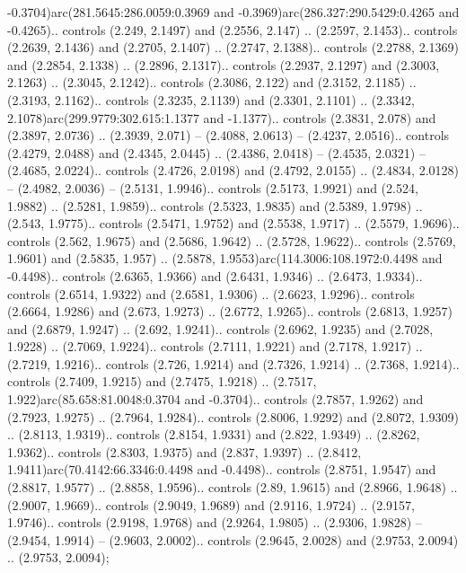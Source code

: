 -0.3704)arc(281.5645:286.0059:0.3969 and -0.3969)arc(286.327:290.5429:0.4265 and -0.4265).. controls (2.249, 2.1497) and (2.2556, 2.147) .. (2.2597, 2.1453).. controls (2.2639, 2.1436) and (2.2705, 2.1407) .. (2.2747, 2.1388).. controls (2.2788, 2.1369) and (2.2854, 2.1338) .. (2.2896, 2.1317).. controls (2.2937, 2.1297) and (2.3003, 2.1263) .. (2.3045, 2.1242).. controls (2.3086, 2.122) and (2.3152, 2.1185) .. (2.3193, 2.1162).. controls (2.3235, 2.1139) and (2.3301, 2.1101) .. (2.3342, 2.1078)arc(299.9779:302.615:1.1377 and -1.1377).. controls (2.3831, 2.078) and (2.3897, 2.0736) .. (2.3939, 2.071) -- (2.4088, 2.0613) -- (2.4237, 2.0516).. controls (2.4279, 2.0488) and (2.4345, 2.0445) .. (2.4386, 2.0418) -- (2.4535, 2.0321) -- (2.4685, 2.0224).. controls (2.4726, 2.0198) and (2.4792, 2.0155) .. (2.4834, 2.0128) -- (2.4982, 2.0036) -- (2.5131, 1.9946).. controls (2.5173, 1.9921) and (2.524, 1.9882) .. (2.5281, 1.9859).. controls (2.5323, 1.9835) and (2.5389, 1.9798) .. (2.543, 1.9775).. controls (2.5471, 1.9752) and (2.5538, 1.9717) .. (2.5579, 1.9696).. controls (2.562, 1.9675) and (2.5686, 1.9642) .. (2.5728, 1.9622).. controls (2.5769, 1.9601) and (2.5835, 1.957) .. (2.5878, 1.9553)arc(114.3006:108.1972:0.4498 and -0.4498).. controls (2.6365, 1.9366) and (2.6431, 1.9346) .. (2.6473, 1.9334).. controls (2.6514, 1.9322) and (2.6581, 1.9306) .. (2.6623, 1.9296).. controls (2.6664, 1.9286) and (2.673, 1.9273) .. (2.6772, 1.9265).. controls (2.6813, 1.9257) and (2.6879, 1.9247) .. (2.692, 1.9241).. controls (2.6962, 1.9235) and (2.7028, 1.9228) .. (2.7069, 1.9224).. controls (2.7111, 1.9221) and (2.7178, 1.9217) .. (2.7219, 1.9216).. controls (2.726, 1.9214) and (2.7326, 1.9214) .. (2.7368, 1.9214).. controls (2.7409, 1.9215) and (2.7475, 1.9218) .. (2.7517, 1.922)arc(85.658:81.0048:0.3704 and -0.3704).. controls (2.7857, 1.9262) and (2.7923, 1.9275) .. (2.7964, 1.9284).. controls (2.8006, 1.9292) and (2.8072, 1.9309) .. (2.8113, 1.9319).. controls (2.8154, 1.9331) and (2.822, 1.9349) .. (2.8262, 1.9362).. controls (2.8303, 1.9375) and (2.837, 1.9397) .. (2.8412, 1.9411)arc(70.4142:66.3346:0.4498 and -0.4498).. controls (2.8751, 1.9547) and (2.8817, 1.9577) .. (2.8858, 1.9596).. controls (2.89, 1.9615) and (2.8966, 1.9648) .. (2.9007, 1.9669).. controls (2.9049, 1.9689) and (2.9116, 1.9724) .. (2.9157, 1.9746).. controls (2.9198, 1.9768) and (2.9264, 1.9805) .. (2.9306, 1.9828) -- (2.9454, 1.9914) -- (2.9603, 2.0002).. controls (2.9645, 2.0028) and (2.9753, 2.0094) .. (2.9753, 2.0094);



